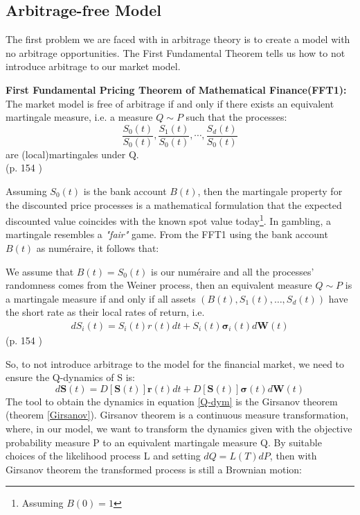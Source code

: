 \subsection{Arbitrage-free Model}
The first problem we are faced with in arbitrage theory is to create a model with no arbitrage opportunities. The First Fundamental Theorem tells us how to not introduce arbitrage to our market model.
\begin{theorem}\label{FFT1}
\textbf{First Fundamental Pricing Theorem of Mathematical Finance(FFT1): } The market model is free of arbitrage if and only if there exists an equivalent martingale measure, i.e. a measure $Q\sim P$ such that the processes:
$$\frac{S_0(t)}{S_0(t)}, \frac{S_1(t)}{S_0(t)}, \cdots, \frac{S_d(t)}{S_0(t)}$$
are (local)martingales under Q.
\\ \null \hfill (p. 154 \parencite{finKont})
\end{theorem}
Assuming $S_0(t)$ is the bank account $B(t)$, then the martingale property for the discounted price processes is a mathematical formulation that the expected discounted value coincides with the known spot value today\footnote{Assuming $B(0)=1$}. In gambling, a martingale resembles a \textsl{"fair"} game. From the FFT1 using the bank account $B(t)$ as numéraire, it follows that:
\theoremstyle{proposition}
\begin{proposition}{}
We assume that $B(t)=S_0(t)$ is our numéraire and all the processes' randomness comes from the Weiner process, then an equivalent measure $Q \sim P$ is a martingale measure if and only if all assets $(B(t), S_1(t), \ldots, S_d(t))$ have the short rate as their local rates of return, i.e.
\begin{align*}
dS_i(t)=S_i(t)r(t)dt+S_i(t)\bm{\sigma}_i(t)d\bm{W}(t)
\end{align*}
\null \hfill (p. 154 \parencite{finKont})
\end{proposition}
So, to not introduce arbitrage to the model for the financial market, we need to ensure the Q-dynamics of S is:
\begin{equation}\label{Q-dym}
d\bm{S}(t)=D[\bm{S}(t)]\bm{r}(t)dt+D[\bm{S}(t)]\bm{\sigma}(t)d\bm{W}(t)
\end{equation}
The tool to obtain the dynamics in equation \eqref{Q-dym} is the Girsanov theorem (theorem \ref{Girsanov}). Girsanov theorem is a continuous measure transformation, where, in our model, we want to transform the dynamics given with the objective probability measure P to an equivalent martingale measure Q. By suitable choices of the likelihood process L and setting $dQ=L(T)dP$, then with Girsanov theorem the transformed process is still a Brownian motion:
